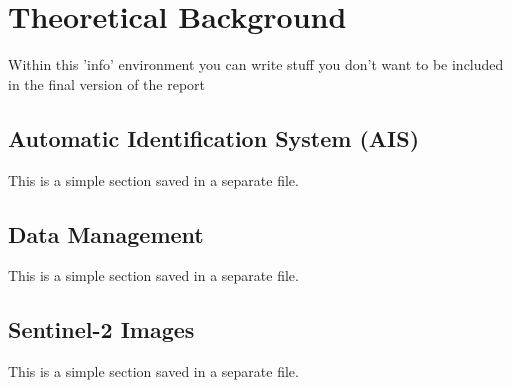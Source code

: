 \chapter{Theoretical Background}
\label{chp:theory}
\begin{info}
	Within this 'info' environment you can write stuff you don't want to be included in the final version of the report
\end{info}

\section{Automatic Identification System (AIS)}
\label{sec:simple}
\begin{info}{}
	This is a simple section saved in a separate file.
\end{info}







\section{Data Management}
\label{sec:simple}
\begin{info}{}
	This is a simple section saved in a separate file.
\end{info}






\section{Sentinel-2 Images}
\label{sec:simple}
\begin{info}{}
	This is a simple section saved in a separate file.
\end{info}








